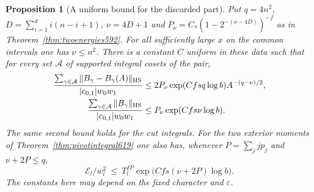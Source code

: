\documentclass[a4paper,11pt]{article}
\newtheorem{proposition}{Proposition}[section]
\theoremstyle{definition}
\theoremstyle{remark}
\numberwithin{equation}{section}
\begin{document}
\begin{proposition}[A uniform bound for the discarded part]
\leavevmode\label{prop:fulltail621}
Put \(q=4n^2\), \(D=\sum_{i=1}^d i(n-i+1)\),
\(\nu=4D+1\) and \(P_\nu=C_*(1-2^{-(\nu-4D)})^{-f}\) as in
Theorem~\ref{thm:twoenergies592}. For all sufficiently large
\(x\) on the common intervals one has \(\nu\le n^2\). There
is a constant \(C\) uniform in these data such that for every
set \(\mathcal A\) of supported integral cosets of the pair,
\begin{align*}
 \frac{\sum_{\gamma\in\mathcal A}
             \|B_\gamma-B_\gamma(A)\|_{\rm HS}}
      {|c_{0,1}|w_0w_1}
 &\le 2P_\nu \exp(Cfsq\log b) A^{-(q-\nu)/2},\\
 \frac{\sum_{\gamma\in\mathcal A}\|B_\gamma\|_{\rm HS}}
      {|c_{0,1}|w_0w_1}
 &\le P_\nu \exp(Cfs\nu\log b).
\end{align*}
The same second bound holds for the cut integrals. For the two
exterior moments of Theorem~\ref{thm:pivotintegral619} one also
has, whenever \(P=\sum_j j p_j\) and \(\nu+2P\le q\),
\[
       \mathcal E_l/w_l^2
       \ \le\ T_l^{fP}\exp\bigl(Cfs(\nu+2P)\log b\bigr).
\]
The constants here may depend on the fixed character and
\(\varepsilon\).
\end{proposition}
\end{document}
